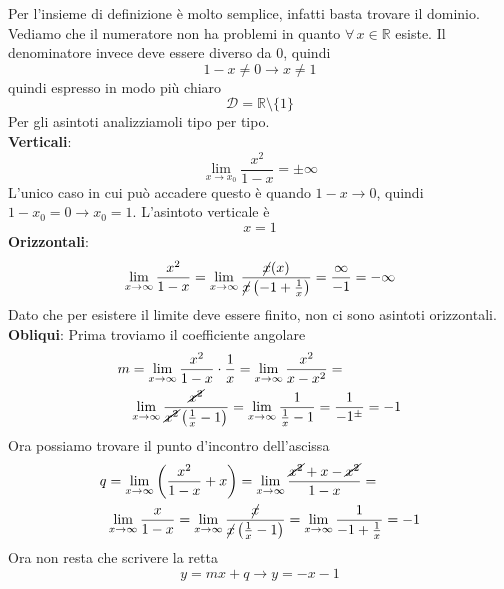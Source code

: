 Per l'insieme di definizione è molto semplice, infatti basta trovare il dominio. Vediamo che il
numeratore non ha problemi in quanto $\forall\,x\in\mathbb{R}$ esiste. Il denominatore invece
deve essere diverso da $0$, quindi
\begin{equation*}
  1-x\neq0 \rightarrow x\neq1
\end{equation*}
quindi espresso in modo più chiaro
\begin{equation*}
  \mathcal{D} = \mathbb{R} \setminus \{1\}
\end{equation*}
Per gli asintoti analizziamoli tipo per tipo.\\
\textbf{Verticali}: 
\begin{equation*}
  \lim\limits_{x\to x_0}\frac{x^2}{1-x} = \pm\infty
\end{equation*}
L'unico caso in cui può accadere questo è quando $1-x\to0$, quindi $1-x_0=0 \rightarrow x_0 = 1$.
L'asintoto verticale è
\begin{equation*}
  \boxed{x = 1}
\end{equation*}
\textbf{Orizzontali}:
\begin{equation*}
  \lim\limits_{x\to\infty}\frac{x^2}{1-x} = 
  \lim\limits_{x\to\infty}\frac{\cancel{x}(x)}{\cancel{x}\left(-1+\frac{1}{x}\right)} = 
  \frac{\infty}{-1} = -\infty
\end{equation*}
Dato che per esistere il limite deve essere finito, non ci sono asintoti orizzontali.\\
\textbf{Obliqui}:
Prima troviamo il coefficiente angolare
\begin{align*}
  m&=\lim\limits_{x\to\infty}\frac{x^2}{1-x}\cdot \frac{1}{x} =
  \lim\limits_{x\to\infty}\frac{x^2}{x-x^2}=\\
  &\lim\limits_{x\to\infty}\frac{\cancel{x^2}}{\cancel{x^2}\left(\frac{1}{x}-1\right)}=
  \lim\limits_{x\to\infty}\frac{1}{\frac{1}{x}-1}=\frac{1}{-1^{\pm}} = -1
\end{align*}
Ora possiamo trovare il punto d'incontro dell'ascissa
\begin{align*}
  q &= \lim\limits_{x\to\infty} \left(\frac{x^2}{1-x}+x\right)=
  \lim\limits_{x\to\infty}\frac{\cancel{x^2}+x-\cancel{x^2}}{1-x}=\\
  &\lim\limits_{x\to\infty}\frac{x}{1-x}=
  \lim\limits_{x\to\infty}\frac{\cancel{x}}{\cancel{x}\left( \frac{1}{x}-1 \right)}=
  \lim\limits_{x\to\infty}\frac{1}{-1+\frac{1}{x}} = -1
\end{align*}
Ora non resta che scrivere la retta
\begin{equation*}
  y = mx+q \rightarrow \boxed{y = -x-1}
\end{equation*}

